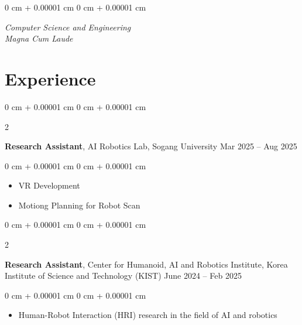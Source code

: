 \documentclass[10pt, letterpaper]{article}
\newenvironment{highlights}{
    \begin{itemize}[
        topsep=0.10 cm,
        parsep=0.10 cm,
        partopsep=0pt,
        itemsep=0pt,
        leftmargin=0 cm + 10pt
    ]
}{
    \end{itemize}
} %
\newenvironment{onecolentry}{
    \begin{adjustwidth}{
        0 cm + 0.00001 cm
    }{
        0 cm + 0.00001 cm
    }
}{
    \end{adjustwidth}
} %
\newenvironment{twocolentry}[2][]{
    \onecolentry
    \def\secondColumn{#2}
    \setcolumnwidth{\fill, 4.5 cm}
    \begin{paracol}{2}
}{
    \switchcolumn \raggedleft \secondColumn
    \end{paracol}
    \endonecolentry
} %
\begin{document}
        \vspace{0.10 cm}
        \begin{onecolentry}
            \textit{Computer Science and Engineering}\\
            \textit{Magna Cum Laude}
        \end{onecolentry}

        \vspace{0.2 cm}


    
    \section{Experience}

        \begin{twocolentry}{
            Mar 2025 -- Aug 2025
        }
            \textbf{Research Assistant}, AI Robotics Lab, Sogang University\end{twocolentry}

        \vspace{0.10 cm}
        \begin{onecolentry}
            \begin{highlights}
                \item VR Development
                \item Motiong Planning for Robot Scan
            \end{highlights}
        \end{onecolentry}
        \vspace{0.2 cm}


        
        \begin{twocolentry}{
            June 2024 -- Feb 2025
        }
            \textbf{Research Assistant}, Center for Humanoid, AI and Robotics Institute, Korea Institute of Science and Technology (KIST)\end{twocolentry}

        \vspace{0.10 cm}
        \begin{onecolentry}
            \begin{highlights}
                \item Human-Robot Interaction (HRI) research in the field of AI and robotics
            \end{highlights}
        \end{onecolentry}
        \vspace{0.2 cm}
\end{document}
